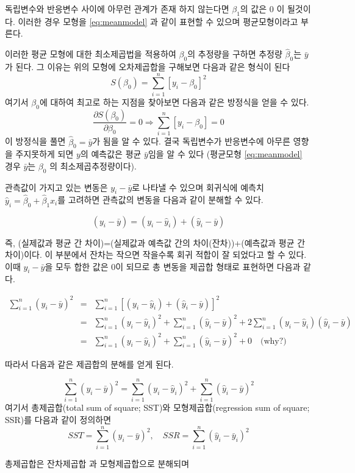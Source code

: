 \documentclass[
]{book}
\theoremstyle{definition}
\theoremstyle{definition}
\theoremstyle{definition}
\theoremstyle{remark}
\begin{document}
독립변수와 반응변수 사이에 아무런 관계가 존재 하지 않는다면 \(\beta_1\)의 값은 0 이 될것이다. 이러한 경우 모형을 \eqref{eq:meanmodel} 과 같이 표현할 수 있으며 평균모형이라고 부른다.

이러한 평균 모형에 대한 최소제곱법을 적용하여 \(\beta_0\)의 추정량을 구하면 추정량 \(\hat \beta_0\)는 \(\bar y\)가 된다. 그 이유는 위의 모형에 오차제곱합을 구해보면 다음과 같은 형식이 된다
\[ S(\beta_0)=  \sum^n_{i=1}[y_i-\beta_0]^2 \]
여기서 \(\beta_0\)에 대하여 최고로 하는 지점을 찾아보면 다음과 같은 방정식을 얻을 수 있다.
\[ \frac{\partial S(\beta_0)}{\partial \beta_0}  = 0  \Rightarrow  \sum^n_{i=1}[y_i - \beta_0] = 0 \]
이 방정식을 풀면 \(\hat \beta_0 = \bar y\)가 됨을 알 수 있다.
결국 독립변수가 반응변수에 아무른 영향을 주지못하게 되면 \(y\)의 예측값은 평균 \(\bar y\)임을 알 수 있다 (평균모형 \eqref{eq:meanmodel} 경우 \(\bar y\)는 \(\beta_0\) 의 최소제곱추정량이다).

관측값이 가지고 있는 변동은 \(y_i - \bar y\)로 나타낼 수 있으며 회귀식에 예측치 \(\hat y_i=\hat \beta_0 + \hat \beta_1 x_i\)를 고려하면 관측값의 변동을 다음과 같이 분해할 수 있다.

\[ (y_i - \bar y) = (y_i - \hat y_i) + (\hat y_i - \bar y) \]

즉, (실제값과 평균 간 차이)=(실제값과 예측값 간의 차이(잔차))+(예측값과 평균 간 차이)이다. 이 부분에서 잔차는 작으면 작을수록 회귀 적합이 잘 되었다고 할 수 있다. 이때 \(y_i - \bar y\)을 모두 합한 값은 0이 되므로 총 변동을 제곱합 형태로 표현하면 다음과 같다.

\begin{eqnarray*}
 \sum^n_{i=1}(y_i - \bar y)^2 &= & \sum^n_{i=1}[(y_i-\hat y_i)+(\hat y_i - \bar y)]^2 \\
 &=& \sum^n_{i=1}(y_i-\hat y_i)^2+\sum^n_{i=1}(\hat y_i - \bar y)^2
        + 2\sum^n_{i=1}(y_i-\hat y_i)(\hat y_i-\bar y)  \\
 &=& \sum^n_{i=1}(y_i-\hat y_i)^2+\sum^n_{i=1}(\hat y_i - \bar y)^2 + 0 \quad \text{(why?)}
 \end{eqnarray*}

따라서 다음과 같은 제곱합의 분해를 얻게 된다.

\[ \sum^n_{i=1}(y_i - \bar y)^2 = \sum^n_{i=1}(y_i-\hat y_i)^2+\sum^n_{i=1}(\hat y_i - \bar y)^2\]
여기서 총제곱합(total sum of square; SST)와 모형제곱합(regression sum of square; SSR)를 다음과 같이 정의하면
\[ SST =  \sum^n_{i=1}(y_i - \bar y)^2, \quad  SSR = \sum^n_{i=1}(\hat y_i-\bar y_i)^2 \]

총제곱합은 잔차제곱합 과 모형제곱합으로 분해되며
\end{document}
